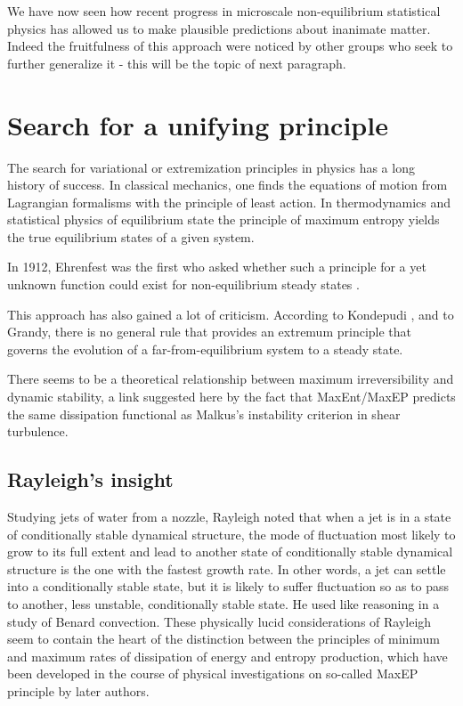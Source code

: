 \documentclass[a4paper,12pt]{article}
\begin{document}
We have now seen how recent progress in microscale non-equilibrium statistical physics has allowed us to make plausible predictions about inanimate matter. Indeed the fruitfulness of this approach were noticed by other groups who seek to further generalize it - this will be the topic of next paragraph.

\section{Search for a unifying principle}

The search for variational or extremization principles in physics has a long history of success. In classical mechanics, one finds the equations of motion from Lagrangian formalisms with the principle of least action. In thermodynamics and statistical physics of equilibrium state the principle of maximum entropy yields the true equilibrium states of a given system. 

In 1912, Ehrenfest was the first who asked whether such a principle for a yet unknown function could exist for non-equilibrium steady states \cite{Dewar:2014ek}.

This approach has also gained a lot of criticism.
According to Kondepudi \cite{Kondepudi:1141550}, and to Grandy\cite{Grandy:1135724}, there is no general rule that provides an extremum principle that governs the evolution of a far-from-equilibrium system to a steady state. 

There seems to be a theoretical relationship between maximum irreversibility and dynamic stability, a link suggested here by the fact that MaxEnt/MaxEP predicts the same dissipation functional as Malkus's instability criterion in shear turbulence\cite{Dewar:2014ek}.

\subsection{Rayleigh's insight}
Studying jets of water from a nozzle, Rayleigh \cite{Rayleigh:1878hb} noted that when a jet is in a state of conditionally stable dynamical structure, the mode of fluctuation most likely to grow to its full extent and lead to another state of conditionally stable dynamical structure is the one with the fastest growth rate. In other words, a jet can settle into a conditionally stable state, but it is likely to suffer fluctuation so as to pass to another, less unstable, conditionally stable state. He used like reasoning in a study of Benard convection\cite{Rayleigh:1916fa}. These physically lucid considerations of Rayleigh seem to contain the heart of the distinction between the principles of minimum and maximum rates of dissipation of energy and entropy production, which have been developed in the course of physical investigations on so-called MaxEP principle by later authors.
\end{document}
